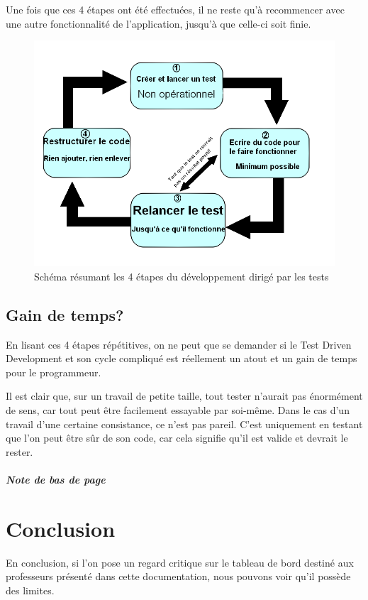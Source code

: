 \documentclass[a4paper,10pt,french]{sphinxmanual}
\begin{document}
Une fois que ces 4 étapes ont été effectuées, il ne reste qu'à
recommencer avec une autre fonctionnalité de l'application, jusqu'à
que celle-ci soit finie.
\begin{figure}[htbp]
\centering
\capstart

\includegraphics[width=0.700\linewidth]{TDD.png}
\caption{Schéma résumant les 4 étapes du développement dirigé par les tests}\end{figure}


\section{Gain de temps?}
\label{tdd:gain-de-temps}
En lisant ces 4 étapes répétitives, on ne peut que se demander si le Test
Driven Development et son cycle compliqué est réellement un atout et un gain
de temps pour le programmeur.

Il est clair que, sur un travail de petite taille, tout tester n'aurait pas
énormément de sens, car tout peut être facilement essayable par soi-même.
Dans le cas d'un travail d'une certaine consistance, ce n'est pas pareil.
C'est uniquement en testant que l'on peut être sûr de son code, car cela
signifie qu'il est valide et devrait le rester.
\paragraph{Note de bas de page}


\chapter{Conclusion}
\label{conclu::doc}\label{conclu:conclusion}
En conclusion, si l'on pose un regard critique sur le tableau de bord destiné
aux professeurs présenté dans cette documentation, nous pouvons voir qu'il
possède des limites.
\end{document}
